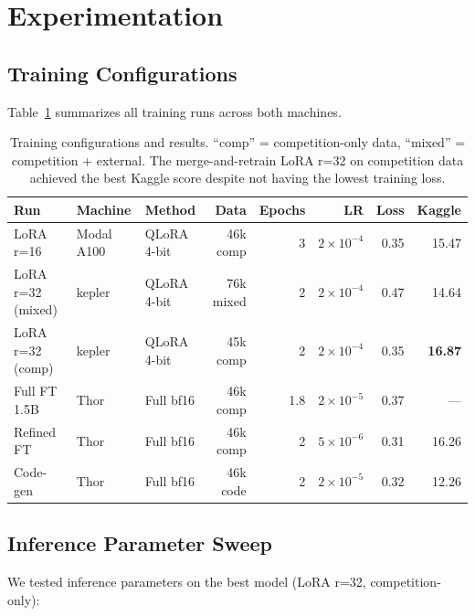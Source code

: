 \documentclass[11pt]{article}
\begin{document}
\section{Experimentation}

\subsection{Training Configurations}
\label{sec:training-configs}

Table~\ref{tab:training-configs} summarizes all training runs across both machines.

\begin{table}[t]
\centering
\small
\begin{tabular}{lllrrrrr}
\toprule
\textbf{Run} & \textbf{Machine} & \textbf{Method} & \textbf{Data} & \textbf{Epochs} & \textbf{LR} & \textbf{Loss} & \textbf{Kaggle} \\
\midrule
LoRA r=16 & Modal A100 & QLoRA 4-bit & 46k comp & 3 & $2 \times 10^{-4}$ & 0.35 & 15.47 \\
LoRA r=32 (mixed) & kepler & QLoRA 4-bit & 76k mixed & 2 & $2 \times 10^{-4}$ & 0.47 & 14.64 \\
LoRA r=32 (comp) & kepler & QLoRA 4-bit & 45k comp & 2 & $2 \times 10^{-4}$ & 0.35 & \textbf{16.87} \\
Full FT 1.5B & Thor & Full bf16 & 46k comp & 1.8 & $2 \times 10^{-5}$ & 0.37 & --- \\
Refined FT & Thor & Full bf16 & 46k comp & 2 & $5 \times 10^{-6}$ & 0.31 & 16.26 \\
Code-gen & Thor & Full bf16 & 46k code & 2 & $2 \times 10^{-5}$ & 0.32 & 12.26 \\
\bottomrule
\end{tabular}
\caption{Training configurations and results. ``comp'' = competition-only data, ``mixed'' = competition + external. The merge-and-retrain LoRA r=32 on competition data achieved the best Kaggle score despite not having the lowest training loss.}
\label{tab:training-configs}
\end{table}

\subsection{Inference Parameter Sweep}

We tested inference parameters on the best model (LoRA r=32, competition-only):
\end{document}

